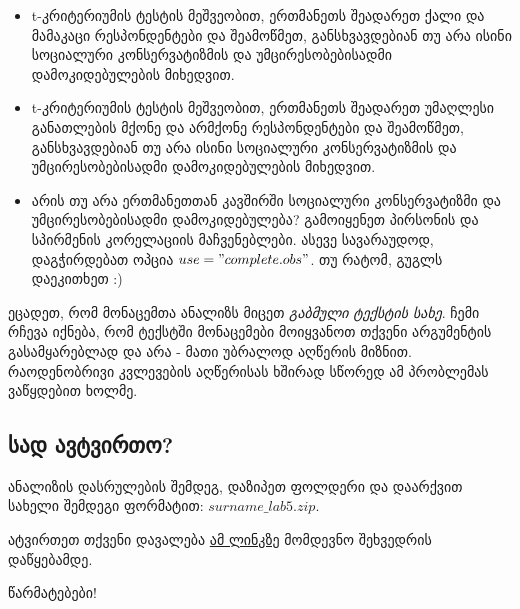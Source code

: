 \documentclass{article}\usepackage[]{graphicx}\usepackage[]{color}
\begin{document}
\begin{itemize}
\item{t-კრიტერიუმის ტესტის მეშვეობით, ერთმანეთს შეადარეთ ქალი და მამაკაცი რესპონდენტები და შეამოწმეთ, განსხვავდებიან თუ არა ისინი სოციალური კონსერვატიზმის და უმცირესობებისადმი დამოკიდებულების მიხედვით.}
\item{t-კრიტერიუმის ტესტის მეშვეობით, ერთმანეთს შეადარეთ უმაღლესი განათლების მქონე და არმქონე რესპონდენტები და შეამოწმეთ, განსხვავდებიან თუ არა ისინი სოციალური კონსერვატიზმის და უმცირესობებისადმი დამოკიდებულების მიხედვით.}
\item{არის თუ არა ერთმანეთთან კავშირში სოციალური კონსერვატიზმი და უმცირესობებისადმი დამოკიდებულება? გამოიყენეთ პირსონის და სპირმენის კორელაციის მაჩვენებლები. ასევე სავარაუდოდ, დაგჭირდებათ ოპცია $use="complete.obs"$. თუ რატომ, გუგლს დაეკითხეთ :)}
\end{itemize}

ეცადეთ, რომ მონაცემთა ანალიზს მიცეთ \emph{გაბმული ტექსტის სახე}. ჩემი რჩევა იქნება, რომ ტექსტში მონაცემები მოიყვანოთ თქვენი არგუმენტის გასამყარებლად და არა - მათი უბრალოდ აღწერის მიზნით. რაოდენობრივი კვლევების აღწერისას ხშირად სწორედ ამ პრობლემას ვაწყდებით ხოლმე.

\subsection*{სად ავტვირთო?}

ანალიზის დასრულების შემდეგ, დაზიპეთ ფოლდერი და დაარქვით სახელი შემდეგი ფორმატით: $surname\_lab5.zip$.

ატვირთეთ თქვენი დავალება \href{https://www.dropbox.com/request/eJJtucX9TouklqWIWrat}{ამ ლინკზე} მომდევნო შეხვედრის დაწყებამდე.


წარმატებები!
\end{document}
